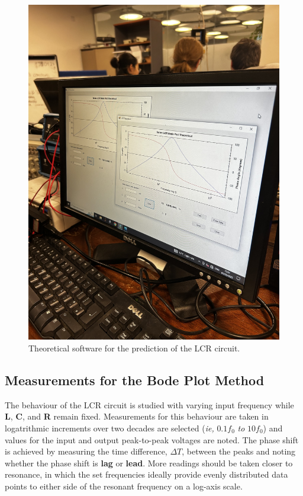 \documentclass[12pt]{article}
\begin{document}
\begin{figure}[H]
    \centering
    \includegraphics[width=14cm, angle=270]{own theo exp.jpeg}
    \caption{\centering \footnotesize{Theoretical software for the prediction of the LCR circuit.}}
    \label{fig:software}
\end{figure}

\subsection{Measurements for the Bode Plot Method} \label{sec:2.2}

The behaviour of the LCR circuit is studied with varying input frequency while \textbf{L}, \textbf{C}, and \textbf{R} remain fixed.
Measurements for this behaviour are taken in logatrithmic increments over two decades are selected (\textit{ie,} $0.1f_0$ \textit{to} $10f_0$) and values for the input and output peak-to-peak
voltages are noted.
The phase shift is achieved by measuring the time difference, $\Delta T$, between the peaks and noting whether the phase shift is \textbf{lag} or \textbf{lead}.
More readings should be taken closer to resonance, in which the set frequencies ideally provide evenly distributed data points to either side of the resonant frequency
on a log-axis scale.
\end{document}
